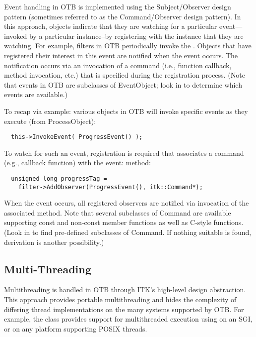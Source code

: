 
Event handling in OTB is implemented using the Subject/Observer design
pattern (sometimes referred to as the Command/Observer
design pattern). In this approach, objects indicate that they are watching
for a particular event---invoked by a particular instance--by registering
with the instance that they are watching.  For example, filters in OTB
periodically invoke the . Objects that have registered
their interest in this event are notified when the event occurs. The
notification occurs via an invocation of a command (i.e., function callback,
method invocation, etc.) that is specified during the registration
process. (Note that events in OTB are subclasses of EventObject; look
in  to determine which events are available.)

To recap via example: various objects in OTB will invoke specific events
as they execute (from ProcessObject):
\small
\begin{verbatim}
  this->InvokeEvent( ProgressEvent() );
\end{verbatim}
\normalsize

To watch for such an event, registration is required that associates a
command (e.g., callback function) with the event:
 method:
\small
\begin{verbatim}
  unsigned long progressTag = 
    filter->AddObserver(ProgressEvent(), itk::Command*);
\end{verbatim}
\normalsize

When the event occurs, all registered observers are notified via invocation
of the associated  method. Note that several
subclasses of Command are available supporting const and
non-const member functions as well as C-style functions. (Look in
 to find pre-defined subclasses of
Command. If nothing suitable is found, derivation is another
possibility.)

\subsection{Multi-Threading}
\label{sec:MultiThreading}

Multithreading is handled in OTB through ITK's high-level design
abstraction. This approach provides portable multithreading and hides the
complexity of differing thread implementations on the many systems supported
by OTB. For example, the class  provides support for
multithreaded execution using  on an SGI, or
 on any platform supporting POSIX threads. 

